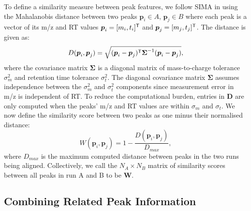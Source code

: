To define a similarity measure between peak features, we follow SIMA \cite{Voss2011a} in using the Mahalanobis distance between two peaks $\boldsymbol{p}_{i}\in A$, $\boldsymbol{p}_{j}\in B$ where each peak is a vector of its m/z and RT values $\boldsymbol{p}_{i}=[m_{i},t_{i}]^{\mathsf{T}}$ and $\boldsymbol{p}_{j}=[m_{j},t_{j}]^{\mathsf{T}}$. The distance is given as: 
\[
D(\boldsymbol{p}_{i},\boldsymbol{p}_{j})=\sqrt{(\boldsymbol{p}_{i}-\boldsymbol{p}_{j})^{\mathsf{T}}\boldsymbol{\Sigma}^{-1}(\boldsymbol{p}_{i}-\boldsymbol{p}_{j})},
\]
where the covariance matrix $\boldsymbol{\Sigma}$ is a diagonal matrix of mass-to-charge tolerance $\sigma^2_{m}$ and retention time tolerance $\sigma^2_{t}$. The diagonal covariance matrix $\boldsymbol{\Sigma}$ assumes independence between the $\sigma^2_{m}$ and $\sigma^2_{t}$ components since measurement error in m/z is independent of RT. To reduce the computational burden, entries in $\boldsymbol{D}$ are only computed when the peaks' m/z and RT values are within $\sigma_{m}$ and $\sigma_{t}$. We now define the similarity score between two peaks as one minus their normalised distance:
\begin{equation}
W(\boldsymbol{p}_{i},\boldsymbol{p}_{j})=1-\frac{D(\boldsymbol{p}_{i},\boldsymbol{p}_{j})}{D_{max}},
\end{equation}
where $D_{max}$ is the maximum computed distance between peaks in the two runs being aligned. Collectively, we call the $N_A\times N_B$ matrix of similarity scores between all peaks in run A and B to be $\boldsymbol{W}$. 

\subsection{Combining Related Peak Information\label{sub:incorporating-grouping}}

